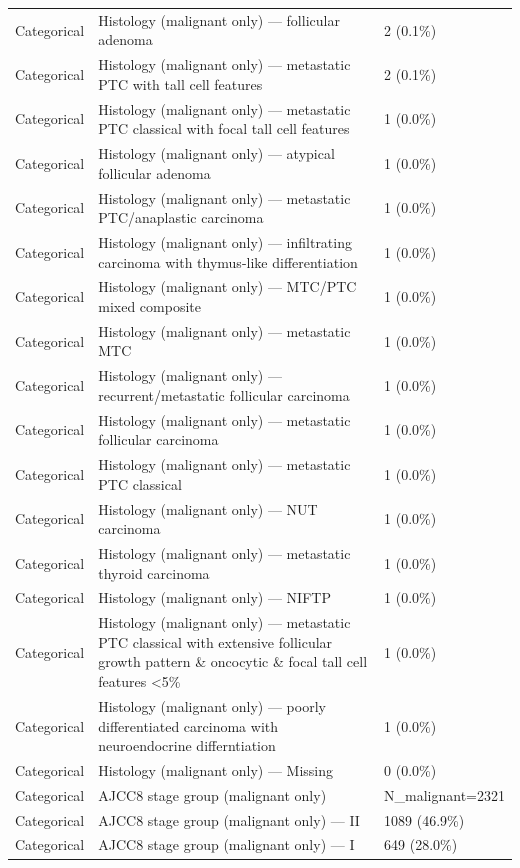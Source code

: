 \begin{table}[htbp]
\begin{tabular}{lll}
Categorical & Histology (malignant only) — follicular adenoma & 2 (0.1\%) \\
Categorical & Histology (malignant only) — metastatic PTC with tall cell features & 2 (0.1\%) \\
Categorical & Histology (malignant only) — metastatic PTC classical with focal tall cell features & 1 (0.0\%) \\
Categorical & Histology (malignant only) — atypical follicular adenoma & 1 (0.0\%) \\
Categorical & Histology (malignant only) — metastatic PTC/anaplastic carcinoma & 1 (0.0\%) \\
Categorical & Histology (malignant only) — infiltrating carcinoma with thymus-like differentiation & 1 (0.0\%) \\
Categorical & Histology (malignant only) — MTC/PTC mixed composite & 1 (0.0\%) \\
Categorical & Histology (malignant only) — metastatic MTC & 1 (0.0\%) \\
Categorical & Histology (malignant only) — recurrent/metastatic follicular carcinoma & 1 (0.0\%) \\
Categorical & Histology (malignant only) — metastatic follicular carcinoma & 1 (0.0\%) \\
Categorical & Histology (malignant only) — metastatic PTC classical & 1 (0.0\%) \\
Categorical & Histology (malignant only) — NUT carcinoma & 1 (0.0\%) \\
Categorical & Histology (malignant only) — metastatic thyroid carcinoma & 1 (0.0\%) \\
Categorical & Histology (malignant only) — NIFTP & 1 (0.0\%) \\
Categorical & Histology (malignant only) — metastatic PTC classical with extensive follicular growth pattern \& oncocytic \& focal tall cell features <5\% & 1 (0.0\%) \\
Categorical & Histology (malignant only) — poorly differentiated carcinoma with neuroendocrine differntiation & 1 (0.0\%) \\
Categorical & Histology (malignant only) — Missing & 0 (0.0\%) \\
Categorical & AJCC8 stage group (malignant only) & N\_malignant=2321 \\
Categorical & AJCC8 stage group (malignant only) — II & 1089 (46.9\%) \\
Categorical & AJCC8 stage group (malignant only) — I & 649 (28.0\%) \\

\end{tabular}
\end{table}
